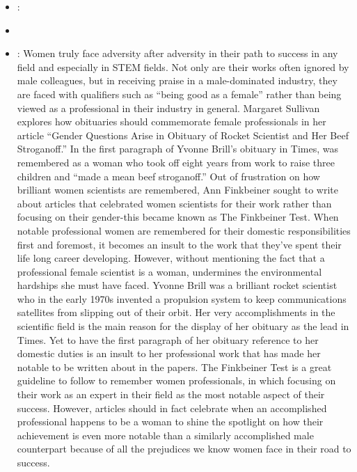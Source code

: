 \documentclass[12pt,a4paper]{article}
\begin{document}
\begin{enumerate}
\begin{itemize}
\begin{itemize}
      \end{itemize}
      \item {}:%
      \item {}
      \item {}: Women truly face adversity after adversity in their path to success in any field and especially in STEM fields. Not only are their works often ignored by male colleagues, but in receiving praise in a male-dominated industry, they are faced with qualifiers such as ``being good as a female'' rather than being viewed as a professional in their industry in general. Margaret Sullivan explores how obituaries should commemorate female professionals in her article ``Gender Questions Arise in Obituary of Rocket Scientist and Her Beef Stroganoff.'' In the first paragraph of Yvonne Brill’s obituary in Times, was remembered as a woman who took off eight years from work to raise three children and ``made a mean beef stroganoff.'' Out of frustration on how brilliant women scientists are remembered, Ann Finkbeiner sought to write about articles that celebrated women scientists for their work rather than focusing on their gender-this became known as The Finkbeiner Test. When notable professional women are remembered for their domestic responsibilities first and foremost, it becomes an insult to the work that they’ve spent their life long career developing. However, without mentioning the fact that a professional female scientist is a woman, undermines the environmental hardships she must have faced. Yvonne Brill was a brilliant rocket scientist who in the early 1970s invented a propulsion system to keep communications satellites from slipping out of their orbit. Her very accomplishments in the scientific field is the main reason for the display of her obituary as the lead in Times. Yet to have the first paragraph of her obituary reference to her domestic duties is an insult to her professional work that has made her notable to be written about in the papers. The Finkbeiner Test is a great guideline to follow to remember women professionals, in which focusing on their work as an expert in their field as the most notable aspect of their success. However, articles should in fact celebrate when an accomplished professional happens to be a woman to shine the spotlight on how their achievement is even more notable than a similarly accomplished male counterpart because of all the prejudices we know women face in their road to success.

\end{itemize}
\end{enumerate}
\end{document}
